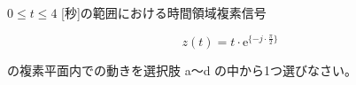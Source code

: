 $0 \leq t \leq 4$ [秒]の範囲における時間領域複素信号 

\[
z(t) = t \cdot \textrm{e}^{\{ -j \cdot \frac{\pi}{2} \}}
\]

\medskip
\noindent の複素平面内での動きを選択肢 a〜d の中から1つ選びなさい。
